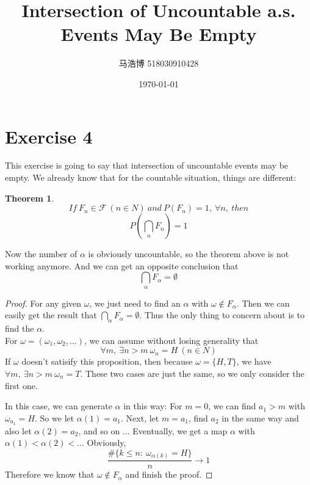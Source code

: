\documentclass[12pt]{article}
\title{Intersection of Uncountable a.s. Events May Be Empty}
\author{马浩博 518030910428}
\date{\today}
\theoremstyle{mythm}
\newtheorem{theorem}{Theorem}
\begin{document}
\maketitle

\section*{Exercise 4}

  This exercise is going to say that intersection of uncountable events may be empty.
  We already know that for the countable situation, things are different:
  \begin{theorem}
  $$If \ F_n \in \mathcal{F} \ (n \in N) \ and \ P(F_n) = 1,\ \forall n, \ then $$
  $$P(\bigcap\limits_{n} F_n) = 1 $$
  \end{theorem}
  Now the number of $\alpha$ is obviously uncountable, so the theorem above is not working anymore.
  And we can get an opposite conclusion that
  $$\bigcap\limits_{\alpha} F_\alpha = \emptyset $$
\begin{proof}

  For any given $\omega$, we just need to find an $\alpha$ with $\omega \notin F_\alpha$.
  Then we can easily get the result that $\bigcap\limits_{\alpha} F_\alpha = \emptyset $.
  Thus the only thing to concern about is to find the $\alpha$.\\

  For $\omega = (\omega_1,\omega_2,\dots)$, we can assume without losing generality that 
  $$\forall m,\ \exists n > m \ \omega_n = H \ (n \in N)$$
  If $\omega$ doesn't satisify this proposition, then because $\omega = \{H,T\}$, we have $\forall m,\ \exists n > m \ \omega_n = T$.
  These two cases are just the same, so we only consider the first one.

  In this case, we can generate $\alpha$ in this way: For $m=0$, we can find $a_1>m$ with $\omega_{a_1} = H$.
  So we let $\alpha(1)=a_1$. Next, let $m=a_1$, find $a_2$ in the same way and also let $\alpha(2)=a_2$, and so on $\dots$ 
  Eventually, we get a map $\alpha$ with $\alpha(1)<\alpha(2)< \dots $ Obviously, 
  $$\frac{\#\{ k \le n: \ \omega_{\alpha(k)} = H \}}{n} \to 1$$
  Therefore we know that $\omega \notin F_\alpha$ and finish the proof.
\end{proof} 
\end{document}
